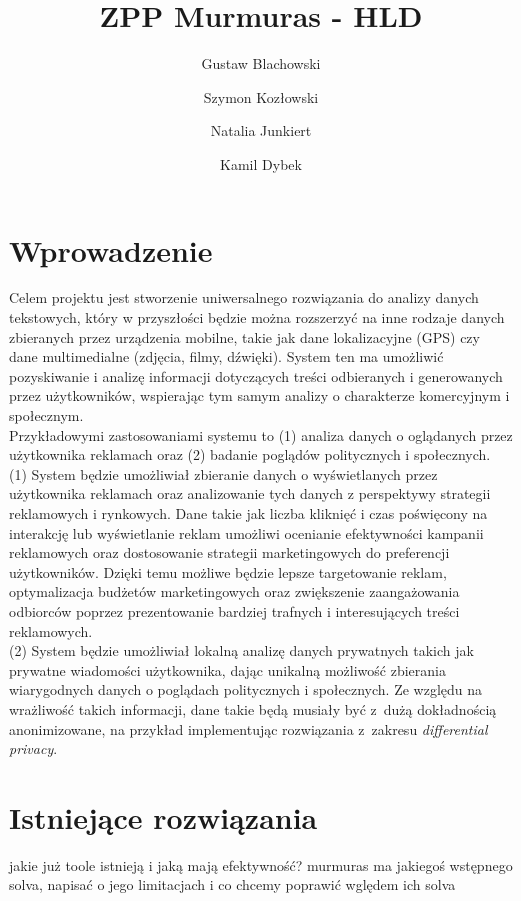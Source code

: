 \documentclass[12pt]{article}
\title{ZPP Murmuras - HLD}
\author{Gustaw Blachowski \and Szymon Kozłowski \and Natalia Junkiert \and Kamil Dybek}
\date{}
\begin{document}
\maketitle

\section*{Wprowadzenie}

Celem projektu jest stworzenie uniwersalnego rozwiązania do analizy danych tekstowych, który w przyszłości będzie można rozszerzyć na inne rodzaje danych zbieranych przez urządzenia mobilne, takie jak dane lokalizacyjne (GPS) czy dane multimedialne (zdjęcia, filmy, dźwięki). System ten ma umożliwić pozyskiwanie i analizę informacji dotyczących treści odbieranych i generowanych przez użytkowników, wspierając tym samym analizy o charakterze komercyjnym i społecznym. \\

Przykładowymi zastosowaniami systemu to (1) analiza danych o oglądanych przez użytkownika reklamach oraz (2) badanie poglądów politycznych i społecznych. \\

(1) System będzie umożliwiał zbieranie danych o wyświetlanych przez użytkownika reklamach oraz analizowanie tych danych z perspektywy strategii reklamowych i rynkowych. Dane takie jak liczba kliknięć i czas poświęcony na interakcję lub wyświetlanie reklam umożliwi ocenianie efektywności kampanii reklamowych oraz dostosowanie strategii marketingowych do preferencji użytkowników. Dzięki temu możliwe będzie lepsze targetowanie reklam, optymalizacja budżetów marketingowych oraz zwiększenie zaangażowania odbiorców poprzez prezentowanie bardziej trafnych i interesujących treści reklamowych. \\

(2) System będzie umożliwiał lokalną analizę danych prywatnych takich jak prywatne wiadomości użytkownika, dając unikalną możliwość zbierania wiarygodnych danych o poglądach politycznych i społecznych. Ze względu na wrażliwość takich informacji, dane takie będą musiały być z~dużą dokładnością anonimizowane, na przykład implementując rozwiązania z~zakresu \emph{differential privacy}.


\section*{Istniejące rozwiązania}

jakie już toole istnieją i jaką mają efektywność? murmuras ma jakiegoś wstępnego solva, napisać o jego limitacjach i co chcemy poprawić wględem ich solva
\end{document}
